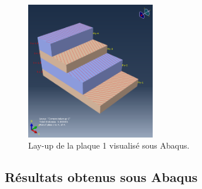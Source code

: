 \documentclass[a4paper,12pt]{article}
\begin{document}
\begin{figure}[h!]
	\centering
	\includegraphics[width=0.5\textwidth]{media/K_P1_layout_12042025.png} %
	\caption{Lay-up de la plaque 1 visualisé sous Abaqus.}
	\label{fig:exemple_image}
\end{figure}

\subsection{Résultats obtenus sous Abaqus}
\end{document}
